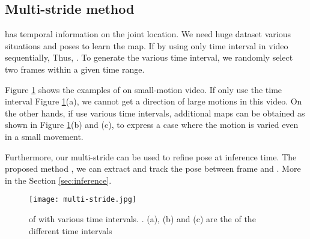 \documentclass[conference]{IEEEtran}
\begin{document}
\subsection{Multi-stride method}


 has temporal information on the joint location. We need  huge dataset  various situations and poses to learn the map. If  by using only  time interval in video sequentially,  Thus, . To generate the various time interval, we randomly select two frames within a given time range.

Figure \ref{fig:multi-stride} shows the examples of 
on  small-motion video. If  only use the time interval  Figure \ref{fig:multi-stride}(a), we cannot get a direction of large motions in this video. On the other hands, if  use various time intervals, additional maps can be obtained as shown in Figure \ref{fig:multi-stride}(b) and (c), 
 to express a case where the motion is varied even in a small movement.

Furthermore, our multi-stride  can be used to refine pose at inference time. The proposed  method 
, we can extract and track the pose between frame  and . More  in the Section \ref{sec:inference}.


\begin{figure}[t!]
\centering
  \texttt{[image: multi-stride.jpg]}
  \caption{ of 
  with various time intervals. . (a), (b) and (c) are the  of  the different time intervals 
}
  \label{fig:multi-stride}
\end{figure}
\end{document}
